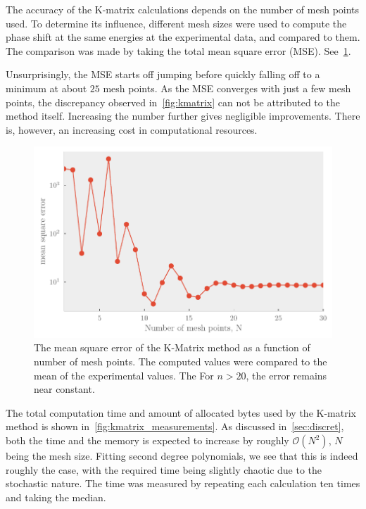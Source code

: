 The accuracy of the K-matrix calculations depends on the number of mesh points
used. To determine its influence, different mesh sizes were used to compute the
phase shift at the same energies at the experimental data, and compared to them.
The comparison was made by taking the total mean square error (MSE).
See~\cref{fig:kmatrix_accuracy}. 

Unsurprisingly, the MSE starts off jumping before quickly falling off to a
minimum at about \(25\) mesh points.  As the MSE converges with just a few mesh points, the
discrepancy observed in~\cref{fig:kmatrix} can not be attributed to the method
itself. Increasing the number further gives
negligible improvements. There is, however, an increasing cost in computational
resources.


\begin{figure}[ht!]
  \centering
  \includegraphics[]{Figures/kmatrix_accuracy}
  \caption{\label{fig:kmatrix_accuracy}The mean square error of the K-Matrix method as a
  function of number of mesh points. The computed values were compared to the
  mean of the experimental values. The For \(n>20\), the error remains near
  constant.}
\end{figure}

The total computation time and amount of allocated bytes used by the K-matrix
method is shown in~\cref{fig:kmatrix_measurements}. As discussed
in~\cref{sec:discret}, both the time and the memory is expected to increase by roughly
\(\mathcal{O}(N^{2})\), \(N\) being the mesh size. Fitting second degree polynomials, we see that this is
indeed roughly the case, with the required time being slightly chaotic due to
the stochastic nature. The
time was measured by repeating each calculation ten times and taking the median.

